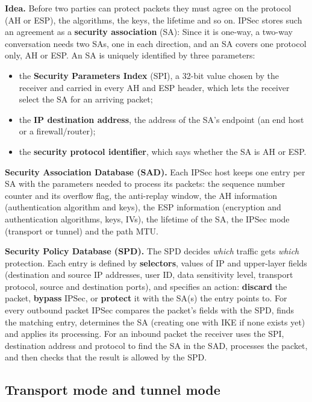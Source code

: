 \textbf{Idea.} Before two parties can protect packets they must agree on the protocol (AH or ESP), the algorithms, the keys, the lifetime and so on. IPSec stores such an agreement as a \textbf{security association} (SA):  Since it is one-way, a two-way conversation needs two SAs, one in each direction, and an SA covers one protocol only, AH or ESP. An SA is uniquely identified by three parameters:
\begin{itemize}
  \item the \textbf{Security Parameters Index} (SPI), a 32-bit value chosen by the receiver and carried in every AH and ESP header, which lets the receiver select the SA for an arriving packet;
  \item the \textbf{IP destination address}, the address of the SA's endpoint (an end host or a firewall/router);
  \item the \textbf{security protocol identifier}, which says whether the SA is AH or ESP.
\end{itemize}

\textbf{Security Association Database (SAD).} Each IPSec host keeps one entry per SA with the parameters needed to process its packets: the sequence number counter and its overflow flag, the anti-replay window, the AH information (authentication algorithm and keys), the ESP information (encryption and authentication algorithms, keys, IVs), the lifetime of the SA, the IPSec mode (transport or tunnel) and the path MTU.

\textbf{Security Policy Database (SPD).} The SPD decides \emph{which} traffic gets \emph{which} protection. Each entry is defined by \textbf{selectors}, values of IP and upper-layer fields (destination and source IP addresses, user ID, data sensitivity level, transport protocol, source and destination ports), and specifies an action: \textbf{discard} the packet, \textbf{bypass} IPSec, or \textbf{protect} it with the SA(s) the entry points to. For every outbound packet IPSec compares the packet's fields with the SPD, finds the matching entry, determines the SA (creating one with IKE if none exists yet) and applies its processing. For an inbound packet the receiver uses the SPI, destination address and protocol to find the SA in the SAD, processes the packet, and then checks that the result is allowed by the SPD.

\subsection{Transport mode and tunnel mode \hot\new}

